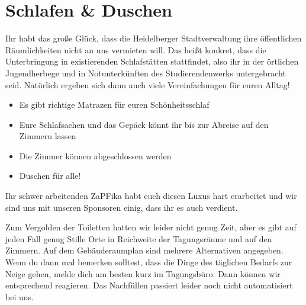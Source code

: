
\section{Schlafen \& Duschen}
  Ihr habt das große Glück, dass die Heidelberger Stadtverwaltung ihre öffentlichen Räumlichkeiten nicht
  an uns vermieten will.
  Das heißt konkret, dass die Unterbringung in existierenden Schlafstätten stattfindet, also ihr
  in der örtlichen Jugendherbege und in Notunterkünften des Studierendenwerks untergebracht seid.
  Natürlich ergeben sich dann auch viele Vereinfachungen für euren Alltag! \\
  \begin{itemize}
    \item Es gibt richtige Matrazen für euren Schönheitsschlaf
    \item Eure Schlafsachen und das Gepäck könnt ihr bis zur Abreise auf den Zimmern lassen
    \item Die Zimmer können abgeschlossen werden
    \item Duschen für alle!
  \end{itemize}


  Ihr schwer arbeitenden ZaPFika habt euch diesen Luxus hart erarbeitet und wir sind uns mit unseren
  Sponsoren einig, dass ihr es auch verdient.

  Zum Vergolden der Toiletten hatten wir leider nicht genug Zeit, aber es gibt auf jeden Fall genug Stille Orte
  in Reichweite der Tagungsräume und auf den Zimmern. Auf dem Gebäuderaumplan 
  sind mehrere Alternativen angegeben. Wenn du dann mal bemerken solltest, dass die Dinge des täglichen Bedarfs zur Neige gehen, melde dich am besten kurz
  im Tagungsbüro.  Dann können wir entsprechend reagieren. Das Nachfüllen passiert leider noch nicht automatisiert bei uns.
